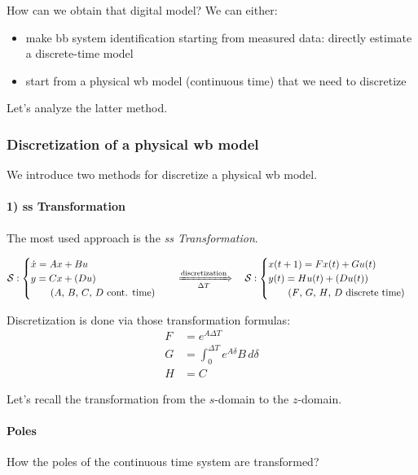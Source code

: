 \begin{appendices}
How can we obtain that digital model? We can either:

\begin{itemize}
    \item make \gls{bb} system identification starting from measured data: directly estimate a discrete-time model
    \item start from a physical \gls{wb} model (continuous time) that we need to discretize 
\end{itemize}

Let's analyze the latter method.

\subsubsection*{Discretization of a physical \gls{wb} model}
We introduce two methods for discretize a physical \gls{wb} model.

\paragraph{1) \acrlong{ss} Transformation}

The most used approach is the \emph{\acrlong{ss} Transformation}.

\[
    \mathcal{S}: \begin{cases}
        \dot{x} = Ax + Bu \\
        y = Cx + (Du) \\
        \qquad \text{($A$, $B$, $C$, $D$ cont. time)}
    \end{cases}
    \quad
    \xRightarrow[\Delta T]{\text{discretization}}
    \quad
    \mathcal{S}: \begin{cases}
        x(t+1) = Fx(t) + Gu(t) \\
        y(t) = Hu(t) + (Du(t)) \\
        \qquad \text{($F$, $G$, $H$, $D$ discrete time)}
    \end{cases}
\]

Discretization is done via those transformation formulas:
\begin{align*}
    F &= e^{A\Delta T} \\
    G &= \int_0^{\Delta T} e^{A\delta}B\, d\delta \\
    H &= C 
\end{align*}

\begin{rem}[$s$-domain] Let's recall the transformation from the $s$-domain to the $z$-domain.
	
	\paragraph{Poles}
    How the poles of the continuous time system are transformed?


\end{rem}
\end{appendices}
